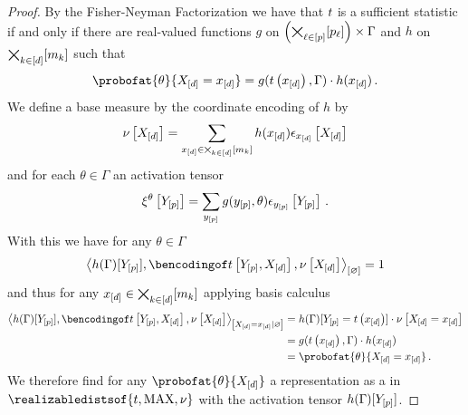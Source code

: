 \documentclass[aps,onecolumn,nofootinbib,pra]{article}
\begin{document}
    \begin{proof}
        By the Fisher-Neyman Factorization  we have that $t$ is a sufficient statistic if and only if there are real-valued functions $g$ on $\left(\bigtimes_{\ell\in[p]}[p_{\ell}]\right)\times \Gamma$ and $h$ on $\bigtimes_{k\in[d]}[m_{k}]$ such that
        \begin{align}
            \label{eq:conFactorizationSufStat}
            \probofat{\theta}{\indexedshortcatvariables}
            = g(\sstatat{\shortcatindices},\Gamma) \cdot h(\shortcatindices) \, .
        \end{align}
        We define a base measure by the coordinate encoding of $h$ by
        \begin{align*}
            \nu\left[X_{[d]}\right] = \sum_{x_{[d]}\in\bigtimes_{k\in[d]}[m_{k}]} h(x_{[d]}) \epsilon_{x_{[d]}}\left[X_{[d]}\right]
        \end{align*}
        and for each $\theta\in\Gamma$ an activation tensor
        \begin{align*}
            \xi^{\theta}\left[Y_{[p]}\right] = \sum_{y_{[p]}} g(y_{[p]},\theta) \epsilon_{y_{[p]}}\left[Y_{[p]}\right] \, .
        \end{align*}
        With this we have for any $\theta\in\Gamma$
        \begin{align*}
            \contraction{h(\Gamma)[\headvariables],\bencsstatwith,\basemeasurewith} = 1
        \end{align*}
        and thus for any $x_{[d]}\in\bigtimes_{k\in[d]}[m_{k}]$ applying basis calculus
        \begin{align*}
            \normalizationof{h(\Gamma)[\headvariables],\bencsstatwith,\basemeasurewith}{\indexedshortcatvariables}
            &= h(\Gamma)[\headvariables=\sstatat{\shortcatindices}] \cdot \basemeasureat{\indexedshortcatvariables} \\
            &= g(\sstatat{\shortcatindices},\Gamma) \cdot h(\shortcatindices) \\
            &= \probofat{\theta}{\indexedshortcatvariables}
            \, .
        \end{align*}
        We therefore find for any $\probofat{\theta}{\shortcatvariables}$ a representation as a \ComputationActivationNetwork{} in $\realizabledistsof{\sstat,\maxgraph,\basemeasure}$ with the activation tensor $h(\Gamma)[Y_{[p]}]$.


\end{proof}
\end{document}
